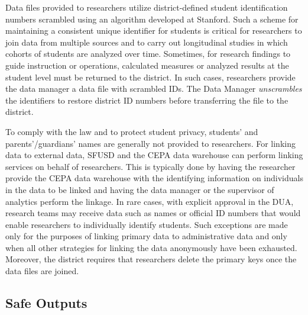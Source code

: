 Data files provided to researchers utilize district-defined student identification numbers scrambled using an algorithm developed at Stanford. Such a scheme for maintaining a consistent unique identifier for students is critical for researchers to join data from multiple sources and to carry out longitudinal studies in which cohorts of students are analyzed over time. Sometimes, for research findings to guide instruction or operations, calculated measures or analyzed results at the student level must be returned to the district. In such cases, researchers provide the data manager a data file with scrambled IDs. The Data Manager \emph{unscrambles} the identifiers to restore district ID numbers before transferring the file to the district.

To comply with the law and to protect student privacy, students' and parents'/guardians' names are generally not provided to researchers. For linking data to external data, SFUSD and the CEPA data warehouse can perform linking services on behalf of researchers. This is typically done by having the researcher provide the CEPA data warehouse with the identifying information on individuals in the data to be linked and having the data manager or the supervisor of analytics perform the linkage. In rare cases, with explicit approval in the DUA, research teams may receive data such as names or official ID numbers that would enable researchers to individually identify students. Such exceptions are made only for the purposes of linking primary data to administrative data and only when all other strategies for linking the data anonymously have been exhausted. Moreover, the district requires that researchers delete the primary keys once the data files are joined.

\hypertarget{safe-outputs-4}{%
\subsection{Safe Outputs}\label{safe-outputs-4}}

